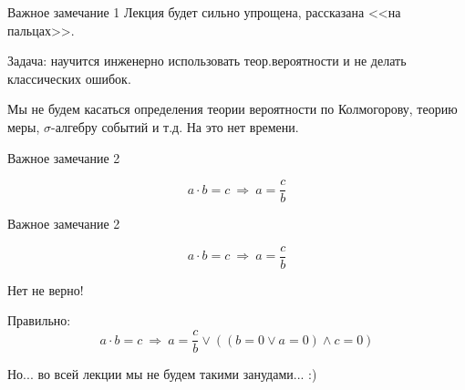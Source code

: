 \begin{frame}{Важное замечание 1}
Лекция будет сильно упрощена, 
рассказана
<<на пальцах>>.

Задача: научится инженерно использовать теор.вероятности и не делать классических ошибок.

Мы не будем касаться определения теории вероятности по Колмогорову,
теорию меры,
$\sigma$-алгебру событий 
и т.д.
На это нет времени.

\end{frame}

\begin{frame}[fragile,t]{Важное замечание 2}
	
	\begin{equation*}
	a \cdot b = c ~\Longrightarrow~ a = \frac{c}{b}
	\end{equation*}
	
	
	
\end{frame}

\begin{frame}[fragile,t]{Важное замечание 2}
	
	\begin{equation*}
	a \cdot b = c ~\Longrightarrow~ a = \frac{c}{b}
	\end{equation*}
	
	Нет не верно!
	
	Правильно:
	\begin{equation*}
	a \cdot b = c ~\Longrightarrow~ a = \frac{c}{b} \vee \left( (b=0 \vee a=0  )\wedge c =0 \right)
	\end{equation*}
	
	Но... во всей лекции мы не будем такими занудами... :)
	
	
\end{frame}


    
  

